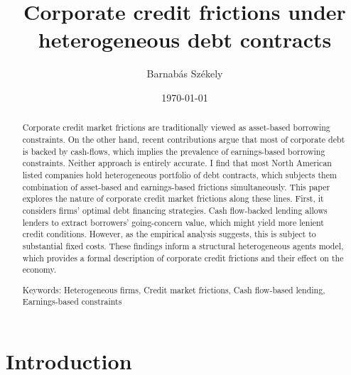 \documentclass[12pt]{article}
\title{Corporate credit frictions under heterogeneous debt contracts}
\date{}
\begin{document}
\author{Barnabás Székely}
\date{\today}
\vspace{-1in}

\maketitle

\begin{abstract}
\noindent

Corporate credit market frictions are traditionally viewed as asset-based borrowing constraints. On the other hand, recent contributions argue that most of corporate debt is backed by cash-flows, which implies the prevalence of earnings-based borrowing constraints. Neither approach is entirely accurate. I find that most North American listed companies hold heterogeneous portfolio of debt contracts, which subjects them combination of asset-based and earnings-based frictions simultaneously. This paper explores the nature of corporate credit market frictions along these lines. First, it considers firms' optimal debt financing strategies. Cash flow-backed lending allows lenders to extract borrowers' going-concern value, which might yield more lenient credit conditions. However, as the empirical analysis suggests, this is subject to substantial fixed costs. These findings inform a structural heterogeneous agents model, which provides a formal description of corporate credit frictions and their effect on the economy.

\bigskip{}
\bigskip{}

Keywords: Heterogeneous firms, Credit market frictions, Cash flow-based lending, Earnings-based constraints

\medskip{}
\end{abstract}
\thispagestyle{empty}

\pagebreak{}


\section{Introduction \label{sec:introduction}} 
\end{document}
